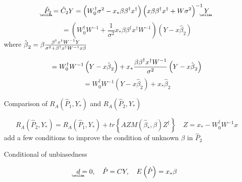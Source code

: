 \documentclass{article}
\begin{document}
\begin{equation*}
\therefore 
\underaccent{\wtilde}{\hat{P}}%
_{2}=\hat{C}_{2}Y=\left( W_{0}^{\dagger }\sigma ^{2}-x_{\ast }\beta \beta
^{\dagger }x^{\dagger }\right) \left( x\beta \beta ^{\dagger }x^{\dagger
}+W\sigma ^{2}\right) ^{-1}%
\underaccent{\wtilde}{Y}%
\end{equation*}%
\begin{equation*}
=\left( W_{0}^{\dagger }W^{-1}+\frac{1}{\sigma ^{2}}x_{\ast }\beta \beta
^{\dagger }x^{\dagger }W^{-1}\right) \left( Y-x\hat{\beta}_{2}\right) 
\end{equation*}%
where $\hat{\beta}_{2}=\beta \frac{\beta ^{\dagger }x^{\dagger }W^{-1}Y}{%
\sigma ^{2}+\beta ^{\dagger }x^{\dagger }W^{-1}x\beta }$

\begin{equation*}
=W_{0}^{\dagger }W^{-1}\left( Y-x\hat{\beta}_{2}\right) +x_{\ast }\frac{%
\beta \beta ^{\dagger }x^{\dagger }W^{-1}}{\sigma ^{2}}\left( Y-x\hat{\beta}%
_{2}\right) 
\end{equation*}%
\begin{equation*}
=W_{0}^{\dagger }W^{-1}\left( Y-x\hat{\beta}_{2}\right) +x_{\ast }\hat{\beta}%
_{2}
\end{equation*}

\bigskip 

Comparison of $R_{A}\left( \hat{P}_{1},Y_{\ast }\right) $ and $R_{A}\left( 
\hat{P}_{2},Y_{\ast }\right) $

\begin{equation*}
R_{A}\left( \hat{P}_{2},Y_{\ast }\right) =R_{A}\left( \hat{P}_{1},Y_{\ast
}\right) +tr\left\{ AZM\left( \hat{\beta}_{\ast },\beta \right) Z^{\dagger
}\right\} \quad Z=x_{\ast }-W_{0}^{\dagger }W^{-1}x
\end{equation*}%
add a few conditions to improve the condition of unknown $\beta $ in $\hat{P}%
_{2}$

\bigskip 

Conditional of unbiasedness

\begin{equation*}
\underaccent{\wtilde}{d}%
=0,\quad \hat{P}=CY,\quad E\left( \hat{P}\right) =x_{\ast }\beta 
\end{equation*}
\end{document}
